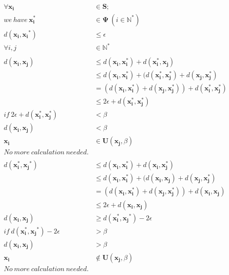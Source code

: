 \documentclass[11pt]{scrartcl}
\begin{document}
\begin{equation*}
\begin{aligned}
\forall \bm{x_i}&\in \bm{S};\\
we\ have \ \bm{x_i^*}&\in \bm{\Psi}\ (i\in\mathbb{N}^*)\\
d(\bm{x_i},\bm{x_i}^*) &\leq \epsilon\\
\forall i,j&\in\mathbb{N}^*\\
\\
d(\bm{x_i},\bm{x_j})&\leq d(\bm{x_i},\bm{x_i^*})+d(\bm{x_i^*},\bm{x_j})\\
&\leq d(\bm{x_i},\bm{x_i^*})+(d(\bm{x_i^*},\bm{x_j^*})+d(\bm{x_j},\bm{x_j^*})\\
&=(d(\bm{x_i},\bm{x_i^*})+d(\bm{x_j},\bm{x_j^*}))+d(\bm{x_i^*},\bm{x_j^*})\\
&\leq 2\epsilon+d(\bm{x_i^*},\bm{x_j^*})\\
if\ 2\epsilon+d(\bm{x_i^*},\bm{x_j^*})&< \beta\\
d(\bm{x_i},\bm{x_j})&< \beta\\
\bm{x_i} &\in \bm{U}(\bm{x_j},\beta)\\
No\ more\ calculation\ needed.\\
\\
d(\bm{x_i^*},\bm{x_j}^*)&\leq d(\bm{x_i},\bm{x_i^*})+d(\bm{x_i},\bm{x_j^*})\\
&\leq d(\bm{x_i},\bm{x_i^*})+(d(\bm{x_i},\bm{x_j})+d(\bm{x_j},\bm{x_j^*})\\
&=(d(\bm{x_i},\bm{x_i^*})+d(\bm{x_j},\bm{x_j^*}))+d(\bm{x_i},\bm{x_j})\\
&\leq 2\epsilon+d(\bm{x_i},\bm{x_j})\\
d(\bm{x_i},\bm{x_j})&\geq d(\bm{x_i^*},\bm{x_j}^*)-2\epsilon\\
if\  d(\bm{x_i^*},\bm{x_j}^*)-2\epsilon &> \beta\\
d(\bm{x_i},\bm{x_j})&> \beta\\
\bm{x_i} &\notin \bm{U}(\bm{x_j},\beta)\\
No\ more\ calculation\ needed.\\
\end{aligned}
\end{equation*}
\\
\end{document}
